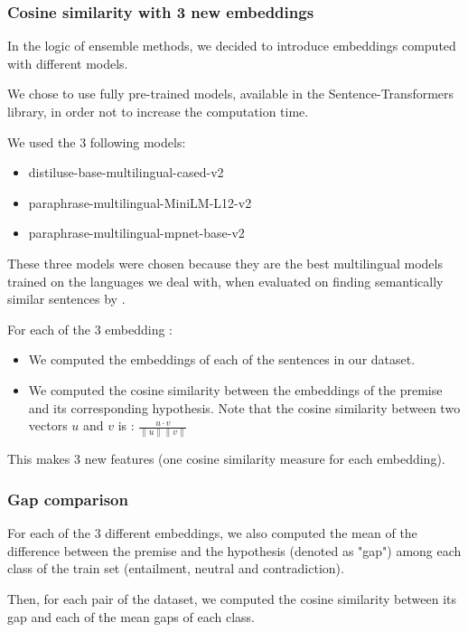 \documentclass[final]{cvpr}
\begin{document}
\subsubsection{Cosine similarity with 3 new embeddings} 

In the logic of ensemble methods, we decided to introduce embeddings computed with different models. 

We chose to use fully pre-trained models, available in the Sentence-Transformers library, in order not to increase the computation time.

We used the 3 following models: 

\begin{itemize}
    \item distiluse-base-multilingual-cased-v2
    \item paraphrase-multilingual-MiniLM-L12-v2
    \item paraphrase-multilingual-mpnet-base-v2
\end{itemize}


These three models were chosen because they are the best multilingual models trained on the languages we deal with, when evaluated on finding semantically similar sentences by \cite{reimers2020}. 

For each of the 3 embedding : 

\begin{itemize}
    \item  We computed the embeddings of each of the sentences in our dataset.
    \item We computed the cosine similarity between the embeddings of the premise and its corresponding hypothesis. Note that the cosine similarity between two vectors $u$ and $v$ is : $\frac{u \cdot v}{\|u\| \|v\|}$ 
\end{itemize}

This makes 3 new features (one cosine similarity measure for each embedding).

\subsubsection{Gap comparison} 

For each of the 3 different embeddings, we also computed the mean of the difference between the premise and the hypothesis (denoted as "gap") among each class of the train set (entailment, neutral and contradiction).

Then, for each pair of the dataset, we computed the cosine similarity between its gap and each of the mean gaps of each class. 
\end{document}
